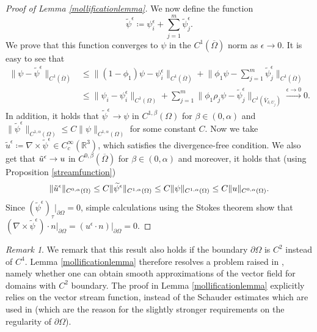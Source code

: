\documentclass[12pt,a4paper]{article}
\theoremstyle{definition}
\theoremstyle{remark}
\newtheorem{remark}[theorem]{Remark}
\numberwithin{equation}{section}
\begin{document}
\begin{proof}[Proof of Lemma \ref{mollificationlemma}]
We now define the function
\begin{equation}
\widetilde{\psi}^\epsilon \coloneqq \psi_i^\epsilon + \sum_{j=1}^m \widetilde{\psi}_j^\epsilon.
\end{equation}
We prove that this function converges to $\psi$ in the $C^1 (\overline{\Omega})$ norm as $\epsilon \rightarrow 0$. It is easy to see that
\begin{align*}
\lVert \psi - \widetilde{\psi }^\epsilon \rVert_{C^1 (\overline{\Omega})} &\leq \lVert (1 - \phi_1) \psi - \psi_i^\epsilon \rVert_{C^1 (\overline{\Omega})} + \bigg\lVert \phi_1 \psi - \sum_{j=1}^m \widetilde{\psi}_j^\epsilon \bigg\rVert_{C^1 (\overline{\Omega})} \\
&\leq \lVert \psi_i - \psi_i^\epsilon \rVert_{C^1 (\Omega )} + \sum_{j=1}^m \lVert \phi_1 \rho_j \psi - \widetilde{\psi}_j^\epsilon \rVert_{C^1 (\overline{V}_{\delta,U_j})} \xrightarrow[]{\epsilon \rightarrow 0} 0.
\end{align*}
In addition, it holds that $\widetilde{\psi}^\epsilon \rightarrow \psi$ in $C^{1,\beta} (\Omega)$ for $\beta \in (0, \alpha)$ and $\lVert \widetilde{\psi}^\epsilon \rVert_{C^{1,\alpha} (\Omega)} \leq C \lVert \psi \rVert_{C^{1,\alpha} (\Omega)}$ for some constant $C$. Now we take $\widetilde{u}^\epsilon \coloneqq \nabla \times \widetilde{\psi}^\epsilon \in C^\infty_c (\mathbb{R}^3)$, which satisfies the divergence-free condition. We also get that $\Tilde{u}^\epsilon \rightarrow u $ in $C^{0,\beta} (\overline{\Omega})$ for $\beta \in (0,\alpha)$ and moreover, it holds that (using Proposition \ref{streamfunction})
\begin{equation*}
\lVert \Tilde{u}^\epsilon \rVert_{C^{0,\alpha} (\Omega)} \leq C \lVert \widetilde{\psi}^\epsilon \rVert_{C^{1,\alpha} (\Omega)} \leq C \lVert \psi \rVert_{C^{1,\alpha} (\Omega)} \leq C \lVert u \rVert_{C^{0,\alpha} (\Omega)}.
\end{equation*}
Since $(\widetilde{\psi}^\epsilon )_{\tau} \lvert_{\partial \Omega} = 0$, simple calculations using the Stokes theorem show that $(\nabla \times \widetilde{\psi}^\epsilon ) \cdot n \lvert_{\partial \Omega}= (u^\epsilon \cdot n) \lvert_{\partial \Omega} = 0$.  
\end{proof}
\begin{remark}
We remark that this result also holds if the boundary $\partial \Omega$ is $C^2$ instead of $C^4$. Lemma \ref{mollificationlemma} therefore resolves a problem raised in \cite[~Sections 1.3 and 2.3]{derosa}, namely whether one can obtain smooth approximations of the vector field for domains with $C^2$ boundary. The proof in Lemma \ref{mollificationlemma} explicitly relies on the vector stream function, instead of the Schauder estimates which are used in \cite{derosa} (which are the reason for the slightly stronger requirements on the regularity of $\partial \Omega$).
\end{remark}
\end{document}
